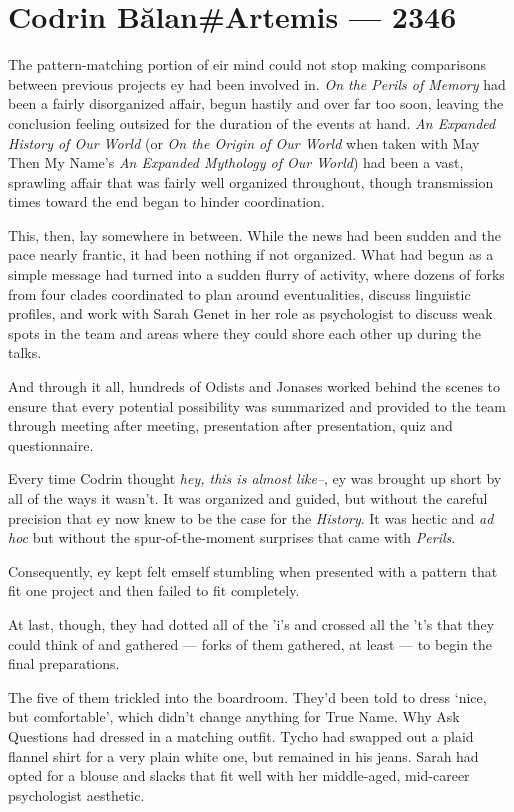 \hypertarget{codrin-bux103lanartemis-2346}{%
\chapter{Codrin Bălan\#Artemis — 2346}\label{codrin-bux103lanartemis-2346}}

The pattern-matching portion of eir mind could not stop making comparisons between previous projects ey had been involved in. \emph{On the Perils of Memory} had been a fairly disorganized affair, begun hastily and over far too soon, leaving the conclusion feeling outsized for the duration of the events at hand. \emph{An Expanded History of Our World} (or \emph{On the Origin of Our World} when taken with May Then My Name's \emph{An Expanded Mythology of Our World}) had been a vast, sprawling affair that was fairly well organized throughout, though transmission times toward the end began to hinder coordination.

This, then, lay somewhere in between. While the news had been sudden and the pace nearly frantic, it had been nothing if not organized. What had begun as a simple message had turned into a sudden flurry of activity, where dozens of forks from four clades coordinated to plan around eventualities, discuss linguistic profiles, and work with Sarah Genet in her role as psychologist to discuss weak spots in the team and areas where they could shore each other up during the talks.

And through it all, hundreds of Odists and Jonases worked behind the scenes to ensure that every potential possibility was summarized and provided to the team through meeting after meeting, presentation after presentation, quiz and questionnaire.

Every time Codrin thought \emph{hey, this is almost like--}, ey was brought up short by all of the ways it wasn't. It was organized and guided, but without the careful precision that ey now knew to be the case for the \emph{History}. It was hectic and \emph{ad hoc} but without the spur-of-the-moment surprises that came with \emph{Perils}.

Consequently, ey kept felt emself stumbling when presented with a pattern that fit one project and then failed to fit completely.

At last, though, they had dotted all of the 'i's and crossed all the 't's that they could think of and gathered — forks of them gathered, at least — to begin the final preparations.

The five of them trickled into the boardroom. They'd been told to dress `nice, but comfortable', which didn't change anything for True Name. Why Ask Questions had dressed in a matching outfit. Tycho had swapped out a plaid flannel shirt for a very plain white one, but remained in his jeans. Sarah had opted for a blouse and slacks that fit well with her middle-aged, mid-career psychologist aesthetic.

